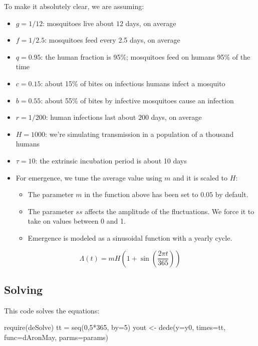 \documentclass[
]{book}
\newenvironment{Shaded}{\begin{snugshade}}{\end{snugshade}}
\newcommand{\AttributeTok}[1]{\textcolor[rgb]{0.77,0.63,0.00}{#1}}
\newcommand{\DecValTok}[1]{\textcolor[rgb]{0.00,0.00,0.81}{#1}}
\newcommand{\FunctionTok}[1]{\textcolor[rgb]{0.00,0.00,0.00}{#1}}
\newcommand{\NormalTok}[1]{#1}
\newcommand{\OtherTok}[1]{\textcolor[rgb]{0.56,0.35,0.01}{#1}}
\newcommand{\SpecialCharTok}[1]{\textcolor[rgb]{0.00,0.00,0.00}{#1}}
\begin{document}
To make it absolutely clear, we are assuming:

\begin{itemize}
\item
  \(g=1/12\): mosquitoes live about \(12\) days, on average
\item
  \(f=1/2.5\): mosquitoes feed every 2.5 days, on average
\item
  \(q=0.95\): the human fraction is 95\%; mosquitoes feed on humans 95\% of the time
\item
  \(c=0.15\): about 15\% of bites on infectious humans infect a mosquito
\item
  \(b=0.55\): about 55\% of bites by infective mosquitoes cause an infection
\item
  \(r=1/200\): human infections last about \(200\) days, on average
\item
  \(H=1000\): we're simulating transmission in a population of a thousand humans
\item
  \(\tau=10\): the extrinsic incubation period is about 10 days
\item
  For emergence, we tune the average value using \(m\) and it is scaled to \(H\):

  \begin{itemize}
  \item
    The parameter \(m\) in the function above has been set to \(0.05\) by default.
  \item
    The parameter \(ss\) affects the amplitude of the fluctuations. We force it to take on values between 0 and 1.
  \item
    Emergence is modeled as a sinusoidal function with a yearly cycle.
  \end{itemize}
\end{itemize}

\[\Lambda(t) = m H \left(1 + \sin \left(\frac{2\pi t}{365}\right)\right)\]

\hypertarget{solving}{%
\subsection{Solving}\label{solving}}

This code solves the equations:

\begin{Shaded}
\begin{Highlighting}[]
\FunctionTok{require}\NormalTok{(deSolve)}
\NormalTok{tt }\OtherTok{=} \FunctionTok{seq}\NormalTok{(}\DecValTok{0}\NormalTok{,}\DecValTok{5}\SpecialCharTok{*}\DecValTok{365}\NormalTok{, }\AttributeTok{by=}\DecValTok{5}\NormalTok{) }
\NormalTok{yout }\OtherTok{\textless{}{-}} \FunctionTok{dede}\NormalTok{(}\AttributeTok{y=}\NormalTok{y0, }\AttributeTok{times=}\NormalTok{tt, }\AttributeTok{func=}\NormalTok{dAronMay, }\AttributeTok{parms=}\NormalTok{params) }
\end{Highlighting}
\end{Shaded}
\end{document}
